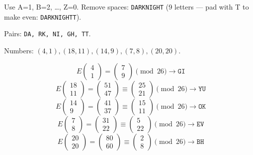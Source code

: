 \documentclass[12pt,a3paper]{article}
\begin{document}
\begin{tcolorbox}[enhanced,breakable,
  colback=cA!4,colframe=cA,boxrule=0.8pt,arc=5pt,
  title={\textbf{Answer --- Encode \texttt{DARK NIGHT} with $E=\begin{pmatrix}1&3\\2&1\end{pmatrix}$}},
  fonttitle=\bfseries\color{white},colbacktitle=cA]
 
Use A=1, B=2, \ldots, Z=0. Remove spaces: \texttt{DARKNIGHT} (9 letters --- pad with T to make even: \texttt{DARKNIGHTT}).
 
Pairs: \texttt{DA, RK, NI, GH, TT}.
 
Numbers: $(4,1),(18,11),(14,9),(7,8),(20,20)$.
 
\[
E\begin{pmatrix}4\\1\end{pmatrix}=\begin{pmatrix}7\\9\end{pmatrix}\pmod{26}\to\texttt{GI}
\]
\[
E\begin{pmatrix}18\\11\end{pmatrix}=\begin{pmatrix}51\\47\end{pmatrix}\equiv\begin{pmatrix}25\\21\end{pmatrix}\pmod{26}\to\texttt{YU}
\]
\[
E\begin{pmatrix}14\\9\end{pmatrix}=\begin{pmatrix}41\\37\end{pmatrix}\equiv\begin{pmatrix}15\\11\end{pmatrix}\pmod{26}\to\texttt{OK}
\]
\[
E\begin{pmatrix}7\\8\end{pmatrix}=\begin{pmatrix}31\\22\end{pmatrix}\equiv\begin{pmatrix}5\\22\end{pmatrix}\pmod{26}\to\texttt{EV}
\]
\[
E\begin{pmatrix}20\\20\end{pmatrix}=\begin{pmatrix}80\\60\end{pmatrix}\equiv\begin{pmatrix}2\\8\end{pmatrix}\pmod{26}\to\texttt{BH}
\]
 

\end{tcolorbox}
\end{document}
